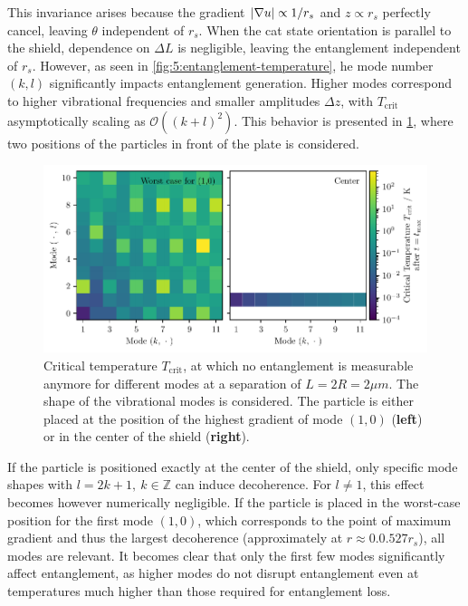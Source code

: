 This invariance arises because the gradient $\left\lvert\nabla u\right\rvert \propto 1/r_s$ and $z \propto r_s$ perfectly cancel, leaving $\theta$ independent of $r_s$. 
When the cat state orientation is parallel to the shield, dependence on $\Delta L$ is negligible, leaving the entanglement independent of $r_s$.
However, as seen in \cref{fig:5:entanglement-temperature}, he mode number $(k, l)$ significantly impacts entanglement generation.
Higher modes correspond to higher vibrational frequencies and smaller amplitudes $\Delta z$, with $T_\mathrm{crit}$ asymptotically scaling as $\mathcal{O}((k + l)^2)$. 
This behavior is presented in \cref{fig:5:T-crit-modes}, where two positions of the particles in front of the plate is considered.
\begin{figure}[!htbp]
  \centering
  \includegraphics[width=\textwidth]{./../figures/vibrations/T-crit-modes.pdf}
  \caption{Critical temperature $T_\mathrm{crit}$, at which no entanglement is measurable anymore for different modes at a separation of $L = 2R = 2\si{\mu m}$. The shape of the vibrational modes is considered. The particle is either placed at the position of the highest gradient of mode $(1,0)$ (\textbf{left}) or in the center of the shield (\textbf{right}).}
  \label{fig:5:T-crit-modes}
\end{figure}
If the particle is positioned exactly at the center of the shield, only specific mode shapes with $l=2k+1,\ k\in\mathbb{Z}$ can induce decoherence.
For $l \neq 1$, this effect becomes however numerically negligible.
If the particle is placed in the worst-case position for the first mode $(1,0)$, which corresponds to the point of maximum gradient and thus the largest decoherence  (approximately at $r \approx 0.0.527 r_s$), all modes are relevant.
It becomes clear that only the first few modes significantly affect entanglement, as higher modes do not disrupt entanglement even at temperatures much higher than those required for entanglement loss.

